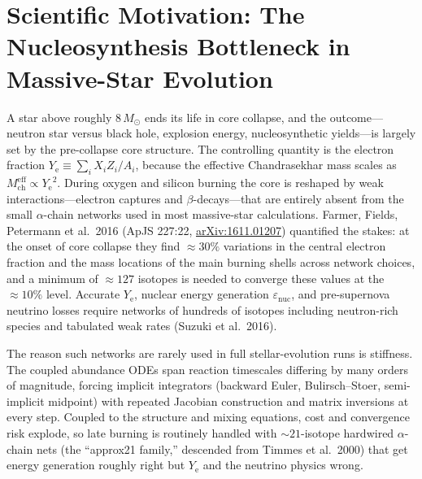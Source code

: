 \documentclass[11pt,a4paper]{article}
\newcommand{\Ye}{\ensuremath{Y_{\mathrm{e}}}}
\newcommand{\Msun}{\ensuremath{M_{\odot}}}
\newcommand{\arxiv}[1]{\href{https://arxiv.org/abs/#1}{arXiv:#1}}
\begin{document}
\tableofcontents

\section{Scientific Motivation: The Nucleosynthesis Bottleneck in Massive-Star Evolution}

A star above roughly $8\,\Msun$ ends its life in core collapse, and the outcome---neutron star versus black hole, explosion energy, nucleosynthetic yields---is largely set by the pre-collapse core structure. The controlling quantity is the electron fraction $\Ye \equiv \sum_i X_i Z_i / A_i$, because the effective Chandrasekhar mass scales as $M_{\mathrm{ch}}^{\mathrm{eff}} \propto \Ye^{2}$. During oxygen and silicon burning the core is reshaped by weak interactions---electron captures and $\beta$-decays---that are entirely absent from the small $\alpha$-chain networks used in most massive-star calculations. Farmer, Fields, Petermann et al.\ 2016 (ApJS 227:22, \arxiv{1611.01207}) quantified the stakes: at the onset of core collapse they find ${\approx}30\%$ variations in the central electron fraction and the mass locations of the main burning shells across network choices, and a minimum of ${\approx}127$ isotopes is needed to converge these values at the ${\approx}10\%$ level. Accurate \Ye, nuclear energy generation $\varepsilon_{\mathrm{nuc}}$, and pre-supernova neutrino losses require networks of hundreds of isotopes including neutron-rich species and tabulated weak rates (Suzuki et al.\ 2016).

The reason such networks are rarely used in full stellar-evolution runs is stiffness. The coupled abundance ODEs span reaction timescales differing by many orders of magnitude, forcing implicit integrators (backward Euler, Bulirsch--Stoer, semi-implicit midpoint) with repeated Jacobian construction and matrix inversions at every step. Coupled to the structure and mixing equations, cost and convergence risk explode, so late burning is routinely handled with ${\sim}21$-isotope hardwired $\alpha$-chain nets (the ``approx21 family,'' descended from Timmes et al.\ 2000) that get energy generation roughly right but \Ye{} and the neutrino physics wrong.
\end{document}
